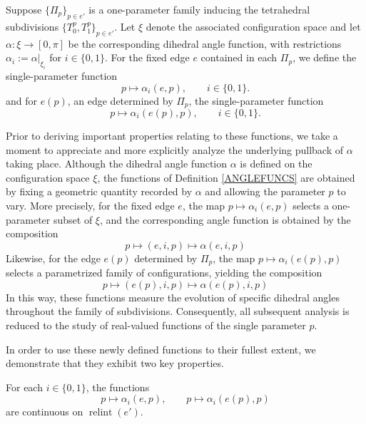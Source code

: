 \documentclass{mainresearch}
\begin{document}
\begin{defin}\label{ANGLEFUNCS}
	Suppose $\{\Pi_p\}_{p \in e'}$ is a one-parameter family inducing the tetrahedral subdivisions $\{T_0^p,T_1^p\}_{p \in e'}$. Let $\xi$ denote the associated configuration space and let $\alpha : \xi \to [0,\pi]$ be the corresponding dihedral angle function, with restrictions $\alpha_i := \alpha|_{\xi_i}$ for $i \in \{0,1\}$. For the fixed edge $e$ contained in each $\Pi_p$, we define the single-parameter function
	\begin{equation}\label{FUNC1}
		p \longmapsto \alpha_i(e,p), \qquad i \in \{0,1\}.
	\end{equation}
	and for $e(p)$, an edge determined by $\Pi_p$, the single-parameter function
	\begin{equation}\label{FUNC2}
		p \longmapsto \alpha_i(e(p),p), \qquad i \in \{0,1\}.
	\end{equation}
\end{defin}
Prior to deriving important properties relating to these functions, we take a moment to appreciate and more explicitly analyze the underlying pullback of $\alpha$ taking place. Although the dihedral angle function $\alpha$ is defined on the configuration space $\xi$, the functions of Definition \ref{ANGLEFUNCS} are obtained by fixing a geometric quantity recorded by $\alpha$ and allowing the parameter $p$ to vary. More precisely, for the fixed edge $e$, the map $p \longmapsto \alpha_i(e,p)$ selects a one-parameter subset of $\xi$, and the corresponding angle function is obtained by the composition
\begin{equation*}
	p \longmapsto (e,i,p) \longmapsto \alpha(e,i,p)
\end{equation*}
Likewise, for the edge $e(p)$ determined by $\Pi_p$, the map $p \longmapsto \alpha_i(e(p),p)$ selects a parametrized family of configurations, yielding the composition
\begin{equation*}
	p \longmapsto (e(p),i,p) \longmapsto \alpha(e(p),i,p)
\end{equation*}
In this way, these functions measure the evolution of specific dihedral angles throughout the family of subdivisions. Consequently, all subsequent analysis is reduced to the study of real-valued functions of the single parameter $p$.

In order to use these newly defined functions to their fullest extent, we demonstrate that they exhibit two key properties.


\begin{lemma}\label{PROP1}
	For each $i \in \{0,1\}$, the functions
	\begin{equation*}
		p \longmapsto \alpha_i(e,p),
		\qquad
		p \longmapsto \alpha_i(e(p),p)
	\end{equation*}
	are continuous on $\operatorname{relint}(e')$.
\end{lemma}
\end{document}

